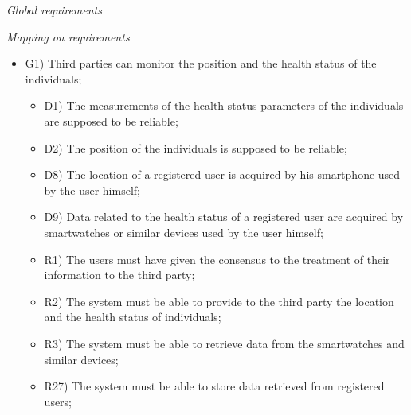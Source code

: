 \documentclass{article}
\begin{document}
\begin{legal}
\begin{legal}
\begin{legal}
			
			\item \textit{Global requirements}\\
			\begin{itemize}
			\end{itemize}
			\item \textit{Mapping on requirements}\\
				\begin{itemize}
				\item G1) Third parties can monitor the position and the health status of the individuals;\\
				{\normalfont
					\begin{itemize}
					\item D1) The measurements of the health status parameters of the individuals are supposed to be reliable;\\
	 				\item D2) The position of the individuals is supposed to be reliable;\\
					\item D8) The location of a registered user is acquired by his smartphone used by the user himself;\\
					\item D9) Data related to the health status of a registered user are acquired by smartwatches or similar devices used by the user himself;\\
					\item R1) The users must have given the consensus to the treatment of their information to the third party;\\
					\item R2) The system must be able to provide to the third party the location and the health status of individuals;
					\item R3) The system must be able to retrieve data from the smartwatches and similar devices;\\
					\item R27) The system must be able to store data retrieved from registered users;\\

\end{itemize}}
\end{itemize}
\end{legal}
\end{legal}
\end{legal}
\end{document}
